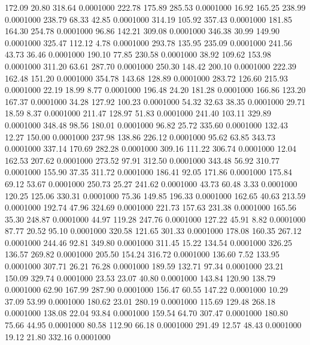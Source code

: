  172.09   20.80  318.64   0.0001000
 222.78  175.89  285.53   0.0001000
  16.92  165.25  238.99   0.0001000
 238.79   68.33   42.85   0.0001000
 314.19  105.92  357.43   0.0001000
 181.85  164.30  254.78   0.0001000
  96.86  142.21  309.08   0.0001000
 346.38   30.99  149.90   0.0001000
 325.47  112.12    4.78   0.0001000
 293.78  135.95  235.09   0.0001000
 241.56   43.73   36.46   0.0001000
 190.10   77.85  230.58   0.0001000
  38.92  109.62  153.98   0.0001000
 311.20   63.61  287.70   0.0001000
 250.30  148.42  200.10   0.0001000
 222.39  162.48  151.20   0.0001000
 354.78  143.68  128.89   0.0001000
 283.72  126.60  215.93   0.0001000
  22.19   18.99    8.77   0.0001000
 196.48   24.20  181.28   0.0001000
 166.86  123.20  167.37   0.0001000
  34.28  127.92  100.23   0.0001000
  54.32   32.63   38.35   0.0001000
  29.71   18.59    8.37   0.0001000
 211.47  128.97   51.83   0.0001000
 241.40  103.11  329.89   0.0001000
 348.48   98.56  180.01   0.0001000
  96.82   25.72  335.60   0.0001000
 132.43   12.27  150.00   0.0001000
 237.98  138.86  226.12   0.0001000
  95.62   63.85  343.73   0.0001000
 337.14  170.69  282.28   0.0001000
 309.16  111.22  306.74   0.0001000
  12.04  162.53  207.62   0.0001000
 273.52   97.91  312.50   0.0001000
 343.48   56.92  310.77   0.0001000
 155.90   37.35  311.72   0.0001000
 186.41   92.05  171.86   0.0001000
 175.84   69.12   53.67   0.0001000
 250.73   25.27  241.62   0.0001000
  43.73   60.48    3.33   0.0001000
 120.25  125.06  330.31   0.0001000
  75.36  149.85  196.33   0.0001000
 162.65   40.63  213.59   0.0001000
 192.74   47.96  324.69   0.0001000
 221.73  157.63  231.38   0.0001000
 165.56   35.30  248.87   0.0001000
  44.97  119.28  247.76   0.0001000
 127.22   45.91    8.82   0.0001000
  87.77   20.52   95.10   0.0001000
 320.58  121.65  301.33   0.0001000
 178.08  160.35  267.12   0.0001000
 244.46   92.81  349.80   0.0001000
 311.45   15.22  134.54   0.0001000
 326.25  136.57  269.82   0.0001000
 205.50  154.24  316.72   0.0001000
 136.60    7.52  133.95   0.0001000
 307.71   26.21   76.28   0.0001000
 189.59  132.71   97.34   0.0001000
  23.21  150.09  329.74   0.0001000
  23.53   23.07   40.80   0.0001000
 143.84  120.90  138.79   0.0001000
  62.90  167.99  287.90   0.0001000
 156.47   60.55  147.22   0.0001000
  10.29   37.09   53.99   0.0001000
 180.62   23.01  280.19   0.0001000
 115.69  129.48  268.18   0.0001000
 138.08   22.04   93.84   0.0001000
 159.54   64.70  307.47   0.0001000
 180.80   75.66   44.95   0.0001000
  80.58  112.90   66.18   0.0001000
 291.49   12.57   48.43   0.0001000
  19.12   21.80  332.16   0.0001000
